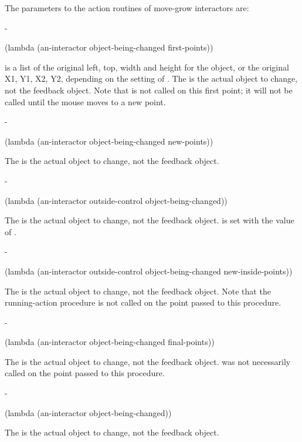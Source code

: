 The parameters to the action routines of move-grow interactors are:

\begin{description}

 -
\begin{programinlist}
(lambda (an-interactor object-being-changed first-points))
\end{programinlist}
 is a list of the original left, top, width and
height for the object, or the original X1, Y1, X2, Y2, depending on the
setting of .  The  is the actual object
to change, not the feedback object.  Note that  is not
called on this first point; it will not be called
until the mouse moves to a new point.



 -
\begin{programinlist}
(lambda (an-interactor object-being-changed new-points))
\end{programinlist}
The  is the actual object
to change, not the feedback object.



 -
\begin{programinlist}
(lambda (an-interactor outside-control object-being-changed))
\end{programinlist}
The  is the actual object
to change, not the feedback object.   is set with the
value of .



 -
\begin{programinlist}
(lambda (an-interactor outside-control object-being-changed new-inside-points))
\end{programinlist}
The  is the actual object
to change, not the feedback object.  Note that
the running-action procedure is not called on the point passed to this
procedure.



 -
\begin{programinlist}
(lambda (an-interactor object-being-changed final-points))
\end{programinlist}
The  is the actual object
to change, not the feedback object.   was not
necessarily called on the point passed to this procedure.



 -
\begin{programinlist}
(lambda (an-interactor object-being-changed))
\end{programinlist}
The  is the actual object
to change, not the feedback object.


\end{description}


